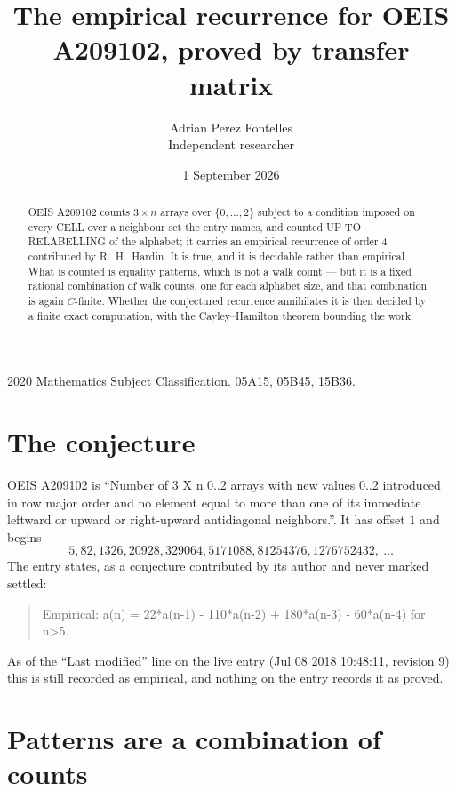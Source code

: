 \documentclass[11pt,a4paper]{article}
\title{The empirical recurrence for OEIS A209102, proved by transfer matrix}
\author{Adrian Perez Fontelles\\ \small Independent researcher}
\date{1 September 2026}
\theoremstyle{plain}
\theoremstyle{definition}
\begin{document}
\maketitle

\begin{abstract}
OEIS A209102 counts $3\times n$ arrays over $\{0,\dots,2\}$ subject to a condition imposed on
every CELL over a neighbour set the entry names, and counted UP TO RELABELLING of the
alphabet; it carries an empirical recurrence of order $4$ contributed by
R.~H.~Hardin. It is true, and it is decidable rather than empirical. What is counted is
equality patterns, which is not a walk count --- but it is a fixed rational combination of
walk counts, one for each alphabet size, and that combination is again $C$-finite. Whether the
conjectured recurrence annihilates it is then decided by a finite exact computation, with the
Cayley--Hamilton theorem bounding the work.
\end{abstract}

\noindent\small 2020 Mathematics Subject Classification. 05A15, 05B45, 15B36.\normalsize

\section{The conjecture}

OEIS A209102 is ``Number of 3 X n 0..2 arrays with new values 0..2 introduced in row major order and no element equal to more than one of its immediate leftward or upward or right-upward antidiagonal neighbors.''. It has offset $1$ and begins
\[
5, 82, 1326, 20928, 329064, 5171088, 81254376, 1276752432,\ \dots
\]
The entry states, as a conjecture contributed by its author and never marked settled:
\begin{quote}
Empirical: a(n) = 22*a(n-1) - 110*a(n-2) + 180*a(n-3) - 60*a(n-4) for n>5.
\end{quote}
As of the ``Last modified'' line on the live entry (Jul 08 2018 10:48:11, revision 9) this is still
recorded as empirical, and nothing on the entry records it as proved.

\section{Patterns are a combination of counts}
\end{document}
